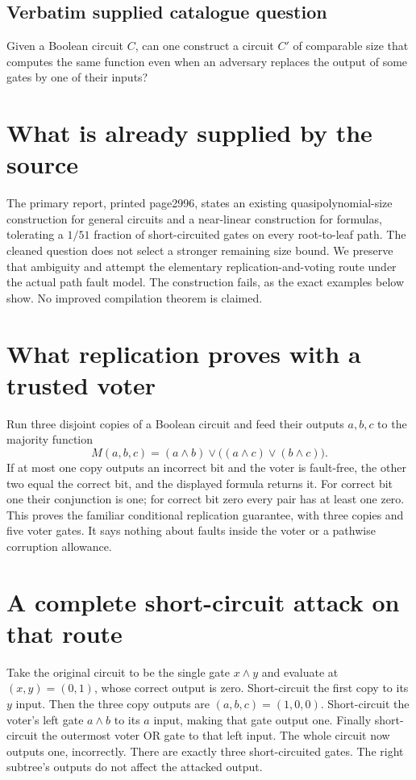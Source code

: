 \documentclass[11pt]{article}
\begin{document}
\subsection{Verbatim supplied catalogue question}
Given a Boolean circuit $C$, can one construct a circuit $C'$ of comparable size that computes the same function even when an adversary replaces the output of some gates by one of their inputs?

\section{What is already supplied by the source}
The primary report, printed page2996, states an existing
quasipolynomial-size construction for general circuits and a
near-linear construction for formulas, tolerating a $1/51$
fraction of short-circuited gates on every root-to-leaf path.
The cleaned question does not select a stronger remaining size
bound. We preserve that ambiguity and attempt the elementary
replication-and-voting route under the actual path fault model.
The construction fails, as the exact examples below show.
No improved compilation theorem is claimed.

\section{What replication proves with a trusted voter}
Run three disjoint copies of a Boolean circuit and feed their
outputs $a,b,c$ to the majority function
\[
 M(a,b,c)=(a\wedge b)\vee\bigl((a\wedge c)\vee(b\wedge c)\bigr).
\]
If at most one copy outputs an incorrect bit and the voter is
fault-free, the other two equal the correct bit, and the displayed
formula returns it. For correct bit one their conjunction is
one; for correct bit zero every pair has at least one zero.
This proves the familiar conditional replication guarantee, with
three copies and five voter gates. It says nothing about faults
inside the voter or a pathwise corruption allowance.

\section{A complete short-circuit attack on that route}
Take the original circuit to be the single gate $x\wedge y$
and evaluate at $(x,y)=(0,1)$, whose correct output is zero.
Short-circuit the first copy to its $y$ input. Then the three
copy outputs are $(a,b,c)=(1,0,0)$. Short-circuit the voter's
left gate $a\wedge b$ to its $a$ input, making that gate output
one. Finally short-circuit the outermost voter OR gate to that
left input. The whole circuit now outputs one, incorrectly.
There are exactly three short-circuited gates. The right
subtree's outputs do not affect the attacked output.
\end{document}

